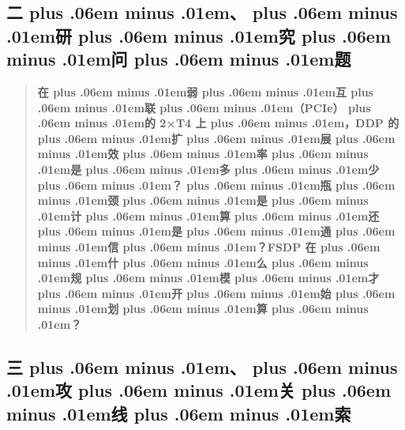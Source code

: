 \documentclass[
]{article}
\def\zh#1{{\zhfont #1}}
\def\sym#1{{\symfont #1}}
\def\zhglue{\hskip0pt plus .06em minus .01em}
\begin{document}
\subsection{\zh{二\zhglue 、\zhglue 研\zhglue 究\zhglue 问\zhglue 题}}\label{ux4e8cux7814ux7a76ux95eeux9898}

\begin{quote}
\textbf{\zh{在\zhglue 弱\zhglue 互\zhglue 联\zhglue （}PCIe\zh{）\zhglue 的} 2\sym{×}T4 \zh{上\zhglue ，}DDP \zh{的\zhglue 扩\zhglue 展\zhglue 效\zhglue 率\zhglue 是\zhglue 多\zhglue 少\zhglue ？\zhglue 瓶\zhglue 颈\zhglue 是\zhglue 计\zhglue 算\zhglue 还\zhglue 是\zhglue 通\zhglue 信\zhglue ？}FSDP \zh{在\zhglue 什\zhglue 么\zhglue 规\zhglue 模\zhglue 才\zhglue 开\zhglue 始\zhglue 划\zhglue 算\zhglue ？}}
\end{quote}

\subsection{\zh{三\zhglue 、\zhglue 攻\zhglue 关\zhglue 线\zhglue 索}}\label{ux4e09ux653bux5173ux7ebfux7d22}
\end{document}
